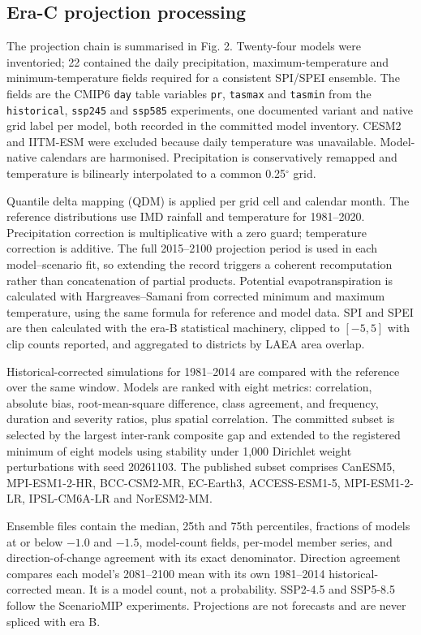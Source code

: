 \documentclass[11pt,a4paper]{article}
\begin{document}
\subsection*{Era-C projection processing}
The projection chain is summarised in Fig. 2. Twenty-four models were inventoried; 22 contained the daily precipitation, maximum-temperature and minimum-temperature fields required for a consistent SPI/SPEI ensemble. The fields are the CMIP6 \texttt{day} table variables \texttt{pr}, \texttt{tasmax} and \texttt{tasmin} from the \texttt{historical}, \texttt{ssp245} and \texttt{ssp585} experiments, one documented variant and native grid label per model, both recorded in the committed model inventory. CESM2 and IITM-ESM were excluded because daily temperature was unavailable. Model-native calendars are harmonised. Precipitation is conservatively remapped and temperature is bilinearly interpolated to a common 0.25$^\circ$ grid.

Quantile delta mapping (QDM) is applied per grid cell and calendar month\citep{Cannon2015}. The reference distributions use IMD rainfall and temperature for 1981--2020. Precipitation correction is multiplicative with a zero guard; temperature correction is additive. The full 2015--2100 projection period is used in each model--scenario fit, so extending the record triggers a coherent recomputation rather than concatenation of partial products. Potential evapotranspiration is calculated with Hargreaves--Samani\citep{HargreavesSamani1985} from corrected minimum and maximum temperature, using the same formula for reference and model data. SPI and SPEI are then calculated with the era-B statistical machinery, clipped to $[-5,5]$ with clip counts reported, and aggregated to districts by LAEA area overlap.

Historical-corrected simulations for 1981--2014 are compared with the reference over the same window. Models are ranked with eight metrics: correlation, absolute bias, root-mean-square difference, class agreement, and frequency, duration and severity ratios, plus spatial correlation. The committed subset is selected by the largest inter-rank composite gap and extended to the registered minimum of eight models using stability under 1,000 Dirichlet weight perturbations with seed 20261103. The published subset comprises CanESM5, MPI-ESM1-2-HR, BCC-CSM2-MR, EC-Earth3, ACCESS-ESM1-5, MPI-ESM1-2-LR, IPSL-CM6A-LR and NorESM2-MM.

Ensemble files contain the median, 25th and 75th percentiles, fractions of models at or below $-1.0$ and $-1.5$, model-count fields, per-model member series, and direction-of-change agreement with its exact denominator. Direction agreement compares each model's 2081--2100 mean with its own 1981--2014 historical-corrected mean. It is a model count, not a probability. SSP2-4.5 and SSP5-8.5 follow the ScenarioMIP experiments\citep{ONeill2016,Riahi2017}. Projections are not forecasts and are never spliced with era B.
\end{document}
